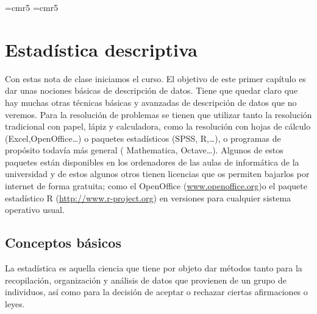 \documentclass[12pt]{report}
\begin{document}
\maketitle
 
\tableofcontents
\newcommand{\RR}{\mbox{I\kern-.2em\hbox{R}}}
\font\fiverm=cmr5 \font\thinlinefont=cmr5
\newcommand{\ZZ}{{{\rm Z}\kern-.28em{\rm Z}}}


\chapter{Estadística descriptiva}

Con estas nota de clase iniciamos el curso. El objetivo de este primer capítulo es dar unas
nociones básicas de descripción de datos. Tiene que quedar claro que hay muchas otras
técnicas básicas y avanzadas de descripción de datos que no veremos. Para la resolución
de problemas se tienen que utilizar tanto  la resolución tradicional con papel, lápiz y
calculadora, como la resolución con hojas de cálculo (Excel,OpenOffice\ldots)
o paquetes estadísticos (SPSS, R,\ldots), o programas de propósito todavía más general ( Mathematica, Octave\ldots).
Algunos de estos paquetes están disponibles en los ordenadores de las  aulas de informática de la
universidad y de estos algunos otros tienen licencias que os permiten bajarlos por  internet de forma gratuita; como el OpenOffice (\url{www.openoffice.org})o el paquete
estadístico R (\url{http://www.r-project.org}) en versiones para cualquier sistema operativo usual.




\section{Conceptos básicos}

La estadística es aquella ciencia que tiene por objeto dar métodos tanto para la
 recopilación, organización y análisis de datos
 que provienen de un grupo de individuos, así como  para la decisión de
aceptar o rechazar ciertas afirmaciones o leyes.
\end{document}
